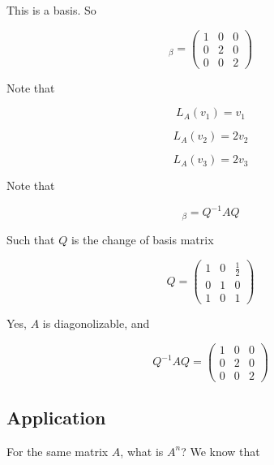 \documentclass{article}
\newtheorem{one minute paper}[theorem]{One Minute Paper}
\begin{document}
This is a basis. So 

\begin{equation}
    [L_A]_\beta = \begin{pmatrix}
        1 & 0 & 0 \\
        0 & 2 & 0 \\
        0 & 0 & 2
    \end{pmatrix}
\end{equation}

Note that 

\begin{equation}
    L_A(v_1) = v_1
\end{equation}

\begin{equation}
    L_A(v_2) = 2v_2
\end{equation}

\begin{equation}
    L_A(v_3) = 2v_3
\end{equation}

Note that 

\begin{equation}
    [L_A]_\beta = Q^{-1}AQ
\end{equation}

Such that $Q$ is the change of basis matrix

\begin{equation}
    Q = \begin{pmatrix}
        1 & 0 & \frac{1}{2}\\
        0 & 1 & 0 \\
        1 & 0 & 1
    \end{pmatrix}
\end{equation}

Yes, $A$ is diagonolizable, and 

\begin{equation}
    Q^{-1}AQ = \begin{pmatrix}
        1 & 0 & 0 \\
        0 & 2 & 0 \\
        0 & 0 & 2
    \end{pmatrix}
\end{equation}

\subsection*{Application}

For the same matrix $A$, what is $A^n$? We know that 
\end{document}
